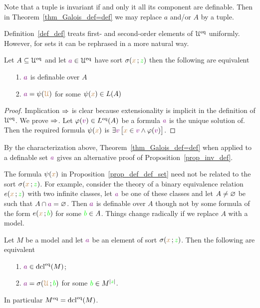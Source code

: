\documentclass[creche.tex]{subfiles}
\begin{document}
Note that a tuple is invariant if and only it all its component are definable. Then in Theorem~\ref{thm_Galois_def=def} we may replace $a$ and/or $A$ by a tuple.

Definition~\ref{def_def} treats first- and second-order elements of $\EuScript U^{{\rm eq}}$ uniformly. However, for sets it can be rephrased in a more natural way.

\begin{proposition}\label{prop_def_def_set}
Let $A\subseteq\EuScript U^{{\rm eq}}$ and let ${\color{violet} a}\in\EuScript U^{{\rm eq}}$ have sort $\sigma({\color{brown} x}\,;{\color{green} z})$ then the following are equivalent
\begin{itemize}
\item[1.] ${\color{violet} a}$ is definable over $A$
\item[2.] ${\color{violet} a}=\psi({\color{brown}\EuScript U})$ for some $\psi({\color{brown} x})\in L(A)$
\end{itemize}
\end{proposition}

\begin{proof}
Implication $\Rightarrow$ is clear because extensionality is implicit in the definition of $\EuScript U^{{\rm eq}}$. We prove $\Rightarrow$. Let $\varphi({\color{violet} v})\in L^{{\rm eq}}(A)$ be a formula ${\color{violet} a}$ is the unique solution of. Then the required formula $\psi({\color{brown} x})$ is $\exists {\color{violet}v}\,\big[{\color{brown} x}\in {\color{violet}v}\wedge\varphi({\color{violet} v})\big]$.
\end{proof}

By the characterization above, Theorem~\ref{thm_Galois_def=def} when applied to a definable set ${\color{violet} a}$ gives an alternative proof of Proposition~\ref{prop_inv_def}.

The formula $\psi({\color{brown} x})$ in Proposition~\ref{prop_def_def_set} need not be related to the sort $\sigma({\color{brown} x}\,;{\color{green} z})$. For example, consider the theory of a binary equivalence relation $e({\color{brown} x}\,;{\color{green} z})$ with two infinite classes, let ${\color{violet} a}$ be one of these classes and let $A\neq\varnothing$ be such that $A\cap {\color{violet}a}=\varnothing$. Then ${\color{violet} a}$ is definable over $A$ though not by some formula of the form $e({\color{brown} x}\,;{\color{green} b})$ for some ${\color{green} b}\in A$. Things change radically if we replace $A$ with a model.  


\begin{proposition}\label{prop_standard_def_set}
Let $M$ be a model and let ${\color{violet} a}$ be an element of sort $\sigma({\color{brown} x}\,;{\color{green} z})$. Then the following are equivalent
\begin{itemize}
\item[1.]  ${\color{violet} a}\in\mathop{\rm dcl}^{{\rm eq}}(M)$; 
\item[2.]  ${\color{violet} a}=\sigma({\color{brown}\EuScript U}\,;{\color{green} b})$ for some ${\color{green} b}\in M^{|{\color{green} z}|}$.
\end{itemize}
In particular $M^{{\rm eq}}=\mathop{\rm dcl}^{{\rm eq}}(M)$.
\end{proposition}
\end{document}
